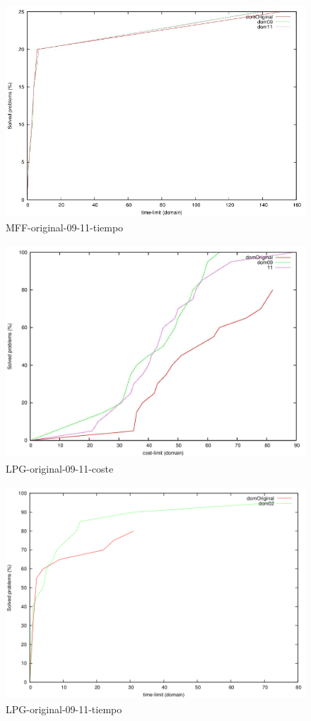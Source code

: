 \documentclass{article}
\begin{document}
    \begin{figure}[H]
        \centering
        \includegraphics[width=12cm, height=8cm]{mff-or-09-11-time}
        \caption{MFF-original-09-11-tiempo}
    \end{figure}
    
    \begin{figure}[H]
        \centering
        \includegraphics[width=12cm, height=8cm]{lpg-or-09-11-cost}
        \caption{LPG-original-09-11-coste}
    \end{figure}
    
    \begin{figure}[H]
        \centering
        \includegraphics[width=12cm, height=8cm]{lpg-or-02-time}
        \caption{LPG-original-09-11-tiempo}
    \end{figure}
    
\end{document}
